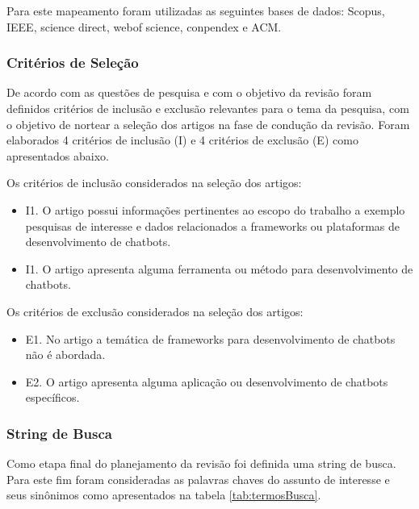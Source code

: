 Para este mapeamento foram utilizadas as seguintes
bases de dados: Scopus, IEEE, science direct, webof science, conpendex e ACM.

\subsubsection{Critérios de Seleção}
De acordo com as questões de pesquisa e com o objetivo da revisão foram definidos
critérios de inclusão e exclusão relevantes para o tema da pesquisa, com o objetivo de nortear a
seleção dos artigos na fase de condução da revisão. Foram elaborados 4 critérios de inclusão (I)
e 4 critérios de exclusão (E) como apresentados abaixo.

Os critérios de inclusão considerados na seleção dos artigos:

\begin{itemize}
    \item I1. O artigo possui informações pertinentes ao escopo do trabalho a exemplo pesquisas de interesse e dados relacionados a frameworks ou plataformas de desenvolvimento de chatbots.
        \item I1. O artigo apresenta alguma ferramenta ou método para desenvolvimento de chatbots.
    
\end{itemize}

Os critérios de exclusão considerados na seleção dos artigos:

\begin{itemize}

    \item E1. No artigo a temática de frameworks para desenvolvimento de chatbots não é abordada.
    \item E2. O artigo apresenta alguma aplicação ou desenvolvimento de chatbots específicos.
    
\end{itemize}

\subsubsection{String de Busca}
Como etapa final do planejamento da revisão foi definida uma string de busca. Para
este fim foram consideradas as palavras chaves do assunto de interesse e seus sinônimos como
apresentados na tabela \ref{tab:termosBusca}.



